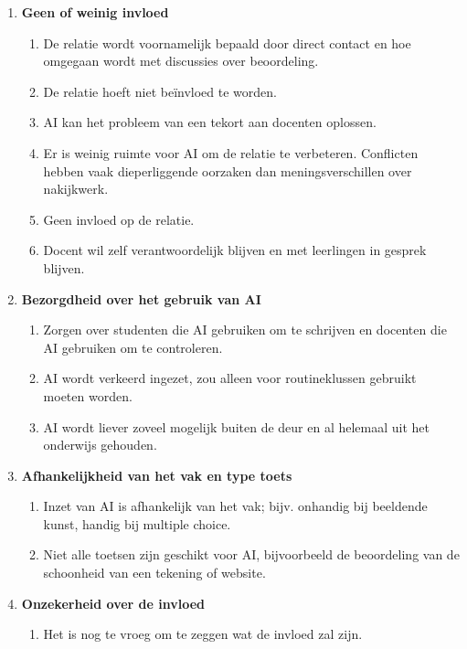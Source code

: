 \documentclass[12pt]{article}
\begin{document}
\begin{enumerate}
\item   \textbf{Geen of weinig invloed}
    \begin{enumerate}
        \item   De relatie wordt voornamelijk bepaald door direct contact en hoe omgegaan wordt met discussies over beoordeling.
        \item   De relatie hoeft niet beïnvloed te worden.
        \item   AI kan het probleem van een tekort aan docenten oplossen.
        \item   Er is weinig ruimte voor AI om de relatie te verbeteren. Conflicten hebben vaak dieperliggende oorzaken dan meningsverschillen over nakijkwerk.
        \item   Geen invloed op de relatie.
        \item   Docent wil zelf verantwoordelijk blijven en met leerlingen in gesprek blijven.
    \end{enumerate}
    \item \textbf{Bezorgdheid over het gebruik van AI}
    \begin{enumerate}
        \item Zorgen over studenten die AI gebruiken om te schrijven en docenten die AI gebruiken om te controleren.
        \item   AI wordt verkeerd ingezet, zou alleen voor routineklussen gebruikt moeten worden.
        \item   AI wordt liever zoveel mogelijk buiten de deur en al helemaal uit het onderwijs gehouden.
    \end{enumerate}

\item   \textbf{Afhankelijkheid van het vak en type toets}
    \begin{enumerate}
        \item   Inzet van AI is afhankelijk van het vak; bijv. onhandig bij beeldende kunst, handig bij multiple choice.
        \item   Niet alle toetsen zijn geschikt voor AI, bijvoorbeeld de beoordeling van de schoonheid van een tekening of website.
    \end{enumerate}
\item   \textbf{Onzekerheid over de invloed}
\begin{enumerate}
     \item  Het is nog te vroeg om te zeggen wat de invloed zal zijn.
\end{enumerate}
\end{enumerate}
\end{document}
